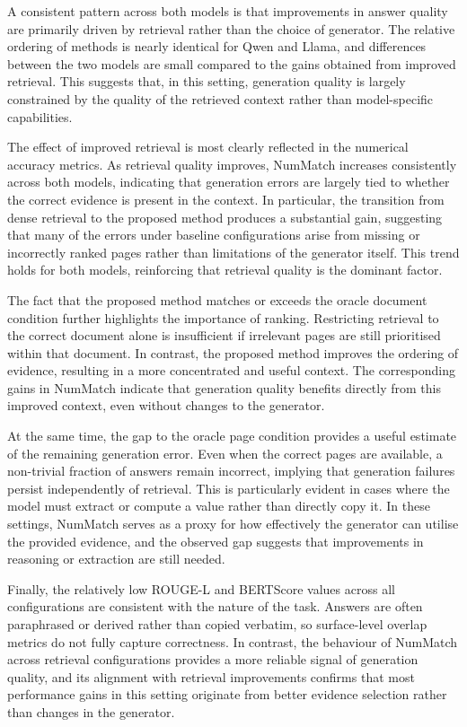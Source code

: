 \documentclass[12pt,twoside,maitrise]{dms}
\theoremstyle{definition}
\numberwithin{equation}{section}
\numberwithin{table}{chapter}
\numberwithin{figure}{chapter}
\begin{document}
A consistent pattern across both models is that improvements in answer quality are
primarily driven by retrieval rather than the choice of generator. The relative ordering
of methods is nearly identical for Qwen and Llama, and differences between the two models
are small compared to the gains obtained from improved retrieval. This suggests that,
in this setting, generation quality is largely constrained by the quality of the retrieved
context rather than model-specific capabilities.

The effect of improved retrieval is most clearly reflected in the numerical accuracy
metrics. As retrieval quality improves, NumMatch increases consistently across both
models, indicating that generation errors are largely tied to whether the correct
evidence is present in the context. In particular, the transition from dense retrieval
to the proposed method produces a substantial gain, suggesting that many of the errors
under baseline configurations arise from missing or incorrectly ranked pages rather
than limitations of the generator itself. This trend holds for both models, reinforcing
that retrieval quality is the dominant factor.

The fact that the proposed method matches or exceeds the oracle document condition
further highlights the importance of ranking. Restricting retrieval to the correct
document alone is insufficient if irrelevant pages are still prioritised within that
document. In contrast, the proposed method improves the ordering of evidence, resulting
in a more concentrated and useful context. The corresponding gains in NumMatch indicate
that generation quality benefits directly from this improved context, even without
changes to the generator.

At the same time, the gap to the oracle page condition provides a useful estimate of the
remaining generation error. Even when the correct pages are available, a non-trivial
fraction of answers remain incorrect, implying that generation failures persist
independently of retrieval. This is particularly evident in cases where the model must
extract or compute a value rather than directly copy it. In these settings, NumMatch
serves as a proxy for how effectively the generator can utilise the provided evidence,
and the observed gap suggests that improvements in reasoning or extraction are still
needed.

Finally, the relatively low ROUGE-L and BERTScore values across all configurations are
consistent with the nature of the task. Answers are often paraphrased or derived rather
than copied verbatim, so surface-level overlap metrics do not fully capture correctness.
In contrast, the behaviour of NumMatch across retrieval configurations provides a more
reliable signal of generation quality, and its alignment with retrieval improvements
confirms that most performance gains in this setting originate from better evidence
selection rather than changes in the generator.
\end{document}
